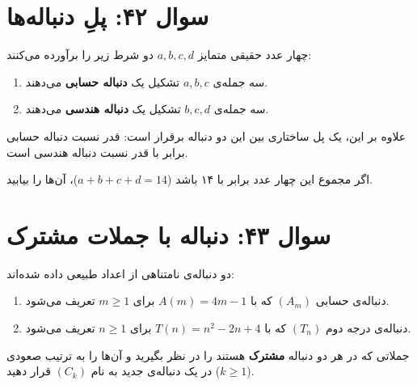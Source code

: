 \documentclass[12pt]{article}
\begin{document}
	\vspace{1cm}
	\hrulefill
	\vspace{1cm}
	
	\section*{سوال ۴۲: پلِ دنباله‌ها }
	چهار عدد حقیقی متمایز \(a, b, c, d\) دو شرط زیر را برآورده می‌کنند:
	\begin{enumerate}[label=(\roman*)]
		\item سه جمله‌ی \(a, b, c\) تشکیل یک \textbf{دنباله حسابی} می‌دهند.
		\item سه جمله‌ی \(b, c, d\) تشکیل یک \textbf{دنباله هندسی} می‌دهند.
	\end{enumerate}
	\vspace{0.5cm}
	
	علاوه بر این، یک پل ساختاری بین این دو دنباله برقرار است: قدر نسبت دنباله حسابی برابر با قدر نسبت دنباله هندسی است.
	\vspace{0.5cm}
	
	اگر مجموع این چهار عدد برابر با ۱۴ باشد (\(a+b+c+d=14\))، آن‌ها را بیابید.
	
	\vspace{1cm}
	\hrulefill
	\vspace{1cm}
	
	\section*{سوال ۴۳: دنباله با جملات مشترک}
	دو دنباله‌ی نامتناهی از اعداد طبیعی داده شده‌اند:
	\begin{enumerate}[label=(\roman*)]
		\item دنباله‌ی حسابی \( (A_m) \) که با \( A(m) = 4m - 1 \) برای \(m \ge 1\) تعریف می‌شود.
		\item دنباله‌ی درجه دوم \( (T_n) \) که با \( T(n) = n^2 - 2n + 4 \) برای \(n \ge 1\) تعریف می‌شود.
	\end{enumerate}
	\vspace{0.5cm}
	
	جملاتی که در هر دو دنباله \textbf{مشترک} هستند را در نظر بگیرید و آن‌ها را به ترتیب صعودی در یک دنباله‌ی جدید به نام \( (C_k) \) قرار دهید (\(k \ge 1\)).
	\vspace{0.5cm}
	
\end{document}
